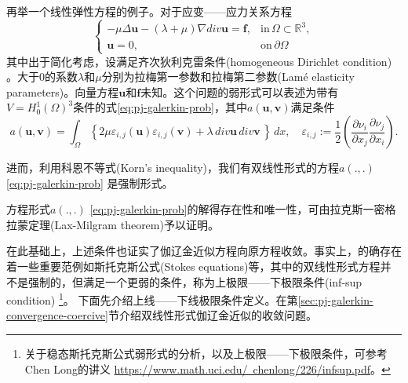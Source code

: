 \begin{subappendices}
再举一个线性弹性方程的例子。对于应变——应力关系方程
\begin{equation*}
  \begin{cases}
    - \mu \Delta \bm{u} - (\lambda + \mu) \nabla div \bm{u} = \bm{f}, & \text{in} \, \Omega \subset \mathbb{R}^3, \\
    \bm{u} = 0, & \text{on} \, \partial \Omega
  \end{cases}
\end{equation*}
其中出于简化考虑，设满足齐次狄利克雷条件(homogeneous Dirichlet condition) 。大于$0$的系数$\lambda$和$\mu$分别为拉梅第一参数和拉梅第二参数(Lamé elasticity parameters)。向量方程$\bm{u}$和$\bm{f}$未知。这个问题的弱形式可以表述为带有$V = H_{0}^{1} (\Omega)^3$条件的式\eqref{eq:pj-galerkin-prob}，其中$a(\bm{u},\bm{v})$满足条件
\begin{equation*}
  a(\bm{u},\bm{v}) = \int_{\Omega} \left\{ 2 \mu \varepsilon_{i,j}(\bm{u}) \varepsilon_{i,j}(\bm{v}) + \lambda \, div \bm{u} \, div \bm{v} \, \right\} \, dx, \quad \varepsilon_{i,j} := \frac{1}{2} \left( \frac{\partial \nu_i}{\partial x_j} \frac{\partial \nu_j}{\partial x_i}\right).
\end{equation*}

进而，利用科恩不等式(Korn's inequality)，我们有双线性形式的方程$a(.,.)$ \eqref{eq:pj-galerkin-prob} 是强制形式。

方程形式$a(.,.)$ \eqref{eq:pj-galerkin-prob}的解得存在性和唯一性，可由拉克斯一密格拉蒙定理(Lax-Milgram theorem)予以证明。

在此基础上，上述条件也证实了伽辽金近似方程向原方程收敛。事实上，的确存在着一些重要范例如斯托克斯公式(Stokes equations)等，其中的双线性形式方程并不是强制的，但满足一个更弱的条件，称为上极限——下极限条件(inf-sup condition) \footnote{关于稳态斯托克斯公式弱形式的分析，以及上极限——下极限条件，可参考Chen Long的讲义 \href{https://www.math.uci.edu/~chenlong/226/infsup.pdf}{https://www.math.uci.edu/~chenlong/226/infsup.pdf}。}。
下面先介绍上线——下线极限条件定义。在第\ref{sec:pj-galerkin-convergence-coercive}节介绍双线性形式伽辽金近似的收敛问题。

\begin{definition}


\end{definition}
\end{subappendices}
